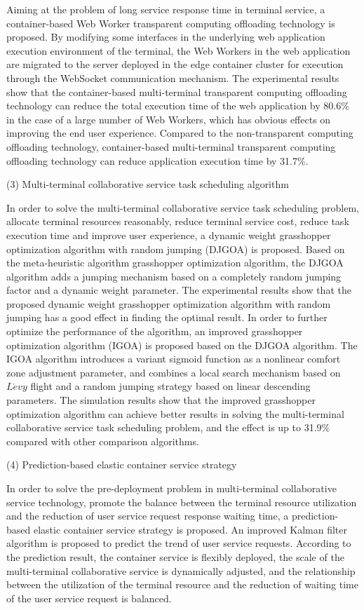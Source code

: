 Aiming at the problem of long service response time in terminal service, a container-based Web Worker transparent computing offloading technology is proposed. By modifying some interfaces in the underlying web application execution environment of the terminal, the Web Workers in the web application are migrated to the server deployed in the edge container cluster for execution through the WebSocket communication mechanism. The experimental results show that the container-based multi-terminal transparent computing offloading technology can reduce the total execution time of the web application by 80.6\% in the case of a large number of Web Workers, which has obvious effects on improving the end user experience. Compared to the non-transparent computing offloading technology, container-based multi-terminal transparent computing offloading technology can reduce application execution time by 31.7\%.

(3) Multi-terminal collaborative service task scheduling algorithm

In order to solve the multi-terminal collaborative service task scheduling problem, allocate terminal resources reasonably, reduce terminal service cost, reduce task execution time and improve user experience, a dynamic weight grasshopper optimization algorithm with random jumping (DJGOA) is proposed. Based on the meta-heuristic algorithm grasshopper optimization algorithm, the DJGOA algorithm adds a jumping mechanism based on a completely random jumping factor and a dynamic weight parameter. The experimental results show that the proposed dynamic weight grasshopper optimization algorithm with random jumping has a good effect in finding the optimal result. In order to further optimize the performance of the algorithm, an improved grasshopper optimization algorithm (IGOA) is proposed based on the DJGOA algorithm.
The IGOA algorithm introduces a variant sigmoid function as a nonlinear comfort zone adjustment parameter, and combines a local search mechanism based on $L\acute{e}vy$ flight and a random jumping strategy based on linear descending parameters.
The simulation results show that the improved grasshopper optimization algorithm can achieve better results in solving the multi-terminal collaborative service task scheduling problem, and the effect is up to 31.9\% compared with other comparison algorithms.

(4) Prediction-based  elastic container service strategy

In order to solve the pre-deployment problem in multi-terminal collaborative service technology, promote the balance between the terminal resource utilization and the reduction of user service request response waiting time, a prediction-based elastic container service strategy is proposed. An improved Kalman filter algorithm is proposed to predict the trend of user service requests. According to the prediction result, the container service is flexibly deployed, the scale of the multi-terminal collaborative service is dynamically adjusted, and the relationship between the utilization of the terminal resource and the reduction of waiting time of the user service request is balanced.


